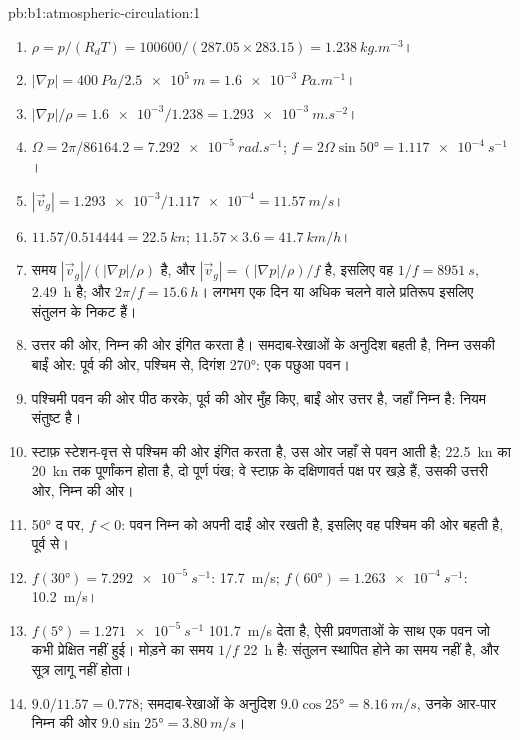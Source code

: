 \begin{solution}{pb:b1:atmospheric-circulation:1}
\begin{enumerate}
  \item $\rho = p/(R_dT) = \num{100600}/(287.05 \times 283.15) =
        \qty{1.238}{kg.m^{-3}}$।
  \item $|\nabla p| = \qty{400}{Pa}/\qty{2.5e5}{m} = \qty{1.6e-3}{Pa.m^{-1}}$।
  \item $|\nabla p|/\rho = \num{1.6e-3}/1.238 = \qty{1.293e-3}{m.s^{-2}}$।
  \item $\Omega = 2\pi/\num{86164.2} = \qty{7.292e-5}{rad.s^{-1}}$;
        $f = 2\Omega\sin\ang{50} = \qty{1.117e-4}{s^{-1}}$।
  \item $|\vec v_g| = \num{1.293e-3}/\num{1.117e-4} = \qty{11.57}{m/s}$।
  \item $11.57/0.514444 = \qty{22.5}{kn}$; $11.57 \times 3.6 = \qty{41.7}{km/h}$।
  \item समय $|\vec v_g|/(|\nabla p|/\rho)$ है, और $|\vec v_g| = (|\nabla
        p|/\rho)/f$ है, इसलिए वह $1/f = \qty{8951}{s}$, \qty{2.49}{h} है; और $2\pi/f =
        \qty{15.6}{h}$। लगभग एक दिन या अधिक चलने वाले प्रतिरूप इसलिए संतुलन के निकट हैं।
  \item {} उत्तर की ओर, निम्न की ओर इंगित करता है।  समदाब-रेखाओं के अनुदिश बहती है, निम्न उसकी बाईं ओर: पूर्व की ओर, पश्चिम से, दिगंश \ang{270}: एक पछुआ पवन।
  \item पश्चिमी पवन की ओर पीठ करके, पूर्व की ओर मुँह किए, बाईं ओर उत्तर है, जहाँ निम्न है: नियम संतुष्ट है।
  \item स्टाफ़ स्टेशन-वृत्त से पश्चिम की ओर इंगित करता है, उस ओर जहाँ से पवन आती है; \qty{22.5}{kn} का \qty{20}{kn} तक पूर्णांकन होता है, दो पूर्ण पंख; वे स्टाफ़ के दक्षिणावर्त पक्ष पर खड़े हैं, उसकी उत्तरी ओर, निम्न की ओर।
  \item \ang{50} द पर, $f < 0$: पवन निम्न को अपनी दाईं ओर रखती है, इसलिए वह पश्चिम की ओर बहती है, पूर्व से।
  \item $f(\ang{30}) = \qty{7.292e-5}{s^{-1}}$: \qty{17.7}{m/s}; $f(\ang{60}) =
        \qty{1.263e-4}{s^{-1}}$: \qty{10.2}{m/s}।
  \item $f(\ang{5}) = \qty{1.271e-5}{s^{-1}}$ \qty{101.7}{m/s} देता है, ऐसी प्रवणताओं के साथ एक पवन जो कभी प्रेक्षित नहीं हुई। मोड़ने का समय $1/f$ \qty{22}{h} है: संतुलन स्थापित होने का समय नहीं है, और सूत्र लागू नहीं होता।
  \item $9.0/11.57 = 0.778$; समदाब-रेखाओं के अनुदिश $9.0\cos\ang{25} = \qty{8.16}{m/s}$, उनके आर-पार निम्न की ओर $9.0\sin\ang{25} = \qty{3.80}{m/s}$।

\end{enumerate}
\end{solution}
